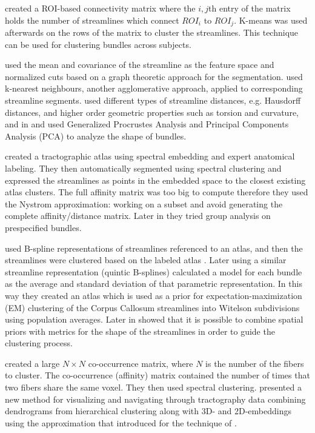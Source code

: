 \documentclass{bioinfo}
\begin{document}
 created a ROI-based connectivity matrix where the
$i,j$th entry of the matrix holds the number of streamlines which
connect $ROI_{i}$ to $ROI_{j}$. K-means was used afterwards on the rows
of the matrix to cluster the streamlines. This technique can be used for
clustering bundles across subjects.

\citet{brun2004clustering} used the mean and covariance of the
streamline as the feature space and normalized cuts based on a graph
theoretic approach for the segmentation. \citet{Ding2003a} used
k-nearest neighbours, another agglomerative approach, applied to
corresponding streamline segments. \citet{corouge2004towards} used
different types of streamline distances, e.g. Hausdorff distances, and
higher order geometric properties such as torsion and curvature, and in
\citet{Corouge2004} and \citet{Corouge2006} used Generalized Procrustes
Analysis and Principal Components Analysis (PCA) to analyze the shape of
bundles.

\citet{ODonnell_IEEETMI07} created a tractographic atlas using spectral
embedding and expert anatomical labeling. They then automatically
segmented using spectral clustering and expressed the streamlines as
points in the embedded space to the closest existing atlas clusters. The
full affinity matrix was too big to compute therefore they used the
Nystrom approximation: working on a subset and avoid generating the
complete affinity/distance matrix. Later in \citet{o2009tract} they
tried group analysis on prespecified bundles.

\citet{Maddah_MICCA2005} used B-spline representations of streamlines
referenced to an atlas, and then the streamlines were clustered based on
the labeled atlas . Later \citet{maddah2006statistical} using a similar
streamline representation (quintic B-splines) calculated a model for
each bundle as the average and standard deviation of that parametric
representation. In this way they created an atlas which is used as a
prior for expectation-maximization (EM) clustering of the Corpus
Callosum streamlines into Witelson subdivisions \citep{witelson1989hand}
using population averages. Later in \citet{Maddah_IEEEBI2008} showed
that it is possible to combine spatial priors with metrics for the shape
of the streamlines in order to guide the clustering process.

\citet{jonasson2005fiber} created a large $N\times N$ co-occurrence
matrix, where $N$ is the number of the fibers to cluster.  The
co-occurrence (affinity) matrix contained the number of times that two
fibers share the same voxel. They then used spectral clustering.
\citet{jianu2009exploring} presented a new method for visualizing and
navigating through tractography data combining dendrograms from
hierarchical clustering along with 3D- and 2D-embeddings using the
approximation that \citet{chalmers1996linear} introduced for the
technique of \citet{eades1984heuristic}.
\end{document}
